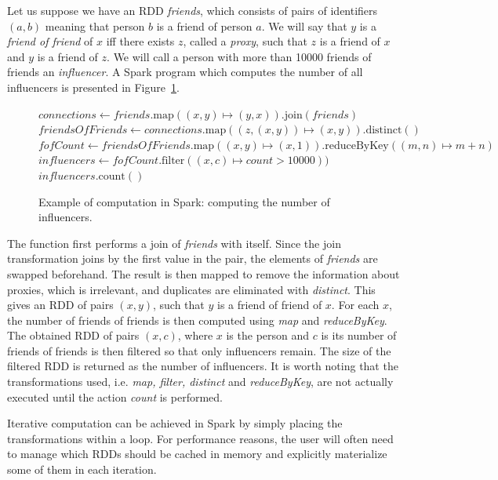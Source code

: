 \begin{exmp}
Let us suppose we have an RDD \emph{friends}, which consists of pairs of identifiers $(a, b)$ meaning that person $b$ is a friend of person $a$. We will say that $y$ is a \emph{friend of friend} of $x$ iff there exists $z$, called a \emph{proxy}, such that $z$ is a friend of $x$ and $y$ is a friend of $z$. We will call a person with more than 10000 friends of friends an \emph{influencer}. A Spark program which computes the number of all influencers is presented in Figure~\ref{ex:sparkfof}.

\begin{figure}[!htbp]
\begin{codebox}
  \li $\textit{connections} \leftarrow \textit{friends}.\text{map}((x, y) \mapsto (y, x)).\text{join}(\textit{friends})$
  \li $\textit{friendsOfFriends} \leftarrow \textit{connections}.\text{map}((z, (x, y)) \mapsto (x, y)).\text{distinct}()$ 
  \li $\textit{fofCount} \leftarrow \textit{friendsOfFriends}.\text{map}((x, y) \mapsto (x, 1)).\text{reduceByKey}((m, n) \mapsto m+n)$
  \li $\textit{influencers} \leftarrow \textit{fofCount}.\text{filter}((x, c) \mapsto count > 10000))$
  \li \Return $\textit{influencers}.\text{count}()$
\end{codebox}
\caption{Example of computation in Spark: computing the number of influencers.}\label{ex:sparkfof}
\end{figure}

The  function first performs a join of \emph{friends} with itself. Since the join transformation joins by the first value in the pair, the elements of \emph{friends} are swapped beforehand. The result is then mapped to remove the information about proxies, which is irrelevant, and duplicates are eliminated with \emph{distinct}. This gives an RDD of pairs $(x, y)$, such that $y$ is a friend of friend of $x$. For each $x$, the number of friends of friends is then computed using \emph{map} and \emph{reduceByKey}. The obtained RDD of pairs $(x, c)$, where $x$ is the person and $c$ is its number of friends of friends is then filtered so that only influencers remain. The size of the filtered RDD is returned as the number of influencers. It is worth noting that the transformations used, i.e. \emph{map, filter, distinct} and \emph{reduceByKey}, are not actually executed until the action \emph{count} is performed.

Iterative computation can be achieved in Spark by simply placing the transformations within a loop. For performance reasons, the user will often need to manage which RDDs should be cached in memory and explicitly materialize some of them in each iteration.
\end{exmp}

